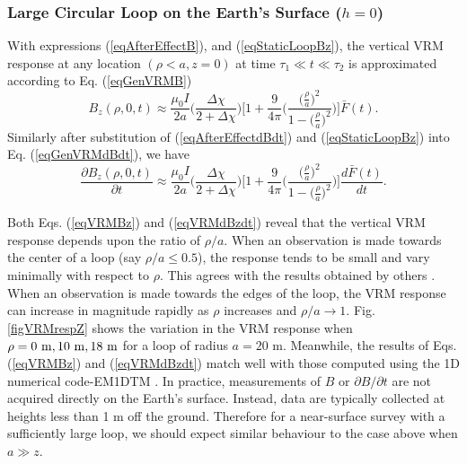 \documentclass[onecolumn]{IEEEtran} %
\begin{document}
\subsubsection{Large Circular Loop on the Earth's Surface ($h=0$)} \label{secVertVRMresp} With expressions (\ref{eqAfterEffectB}), and (\ref{eqStaticLoopBz}), the vertical VRM response at any location $(\rho < a,z=0)$ at time $\tau_1 \ll t \ll \tau_2$ is approximated according to Eq. (\ref{eqGenVRMB})
\begin{equation}
B_z(\rho,0,t) \approx \frac{\mu_0 I}{2a} \Bigg ( \frac{\Delta
\chi}{2+\Delta \chi} \Bigg )  \Bigg [ 1 + \frac{9}{4\pi} \Bigg (
\frac{\big( \frac{\rho}{a} \big )^2}{1- \big( \frac{\rho}{a} \big
)^2} \Bigg ) \Bigg ] \bar F(t).
\label{eqVRMBz}
\end{equation}
Similarly after substitution of (\ref{eqAfterEffectdBdt}) and (\ref{eqStaticLoopBz}) into Eq. (\ref{eqGenVRMdBdt}), we have
\begin{equation} \frac{\partial B_z(\rho,0,t)}{\partial t}  \approx
\frac{\mu_0 I}{2a} \Bigg ( \frac{\Delta \chi}{2+\Delta \chi} \Bigg )
\Bigg [ 1 + \frac{9}{4\pi} \Bigg ( \frac{\big( \frac{\rho}{a} \big
)^2}{1- \big( \frac{\rho}{a} \big )^2} \Bigg ) \Bigg ] \frac{d \bar
F(t)}{dt}.
\label{eqVRMdBzdt}
\end{equation}

Both Eqs. (\ref{eqVRMBz}) and (\ref{eqVRMdBzdt}) reveal that the vertical VRM response depends upon the ratio of $\rho/a$. When an observation is made towards the center of a loop (say $\rho/a \leq 0.5$), the response tends to be small and vary minimally with respect to $\rho$. This agrees with the results obtained by others \cite{Buselli1982,Barsukov2001}. When an observation is made towards the edges of the loop, the VRM response can increase in magnitude rapidly as $\rho$ increases and $\rho/a \rightarrow 1$. Fig. \ref{figVRMrespZ} shows the variation in the VRM response when $\rho = 0 ~{\rm m}, 10 ~{\rm m}, 18 ~{\rm m}$ for a loop of radius $a=20$ m. Meanwhile, the results of Eqs. (\ref{eqVRMBz}) and (\ref{eqVRMdBzdt}) match well with those computed using the 1D numerical code-EM1DTM \cite{EM1DTM}. In practice, measurements of $B$ or $\partial B/\partial t$ are not acquired directly on the Earth's surface. Instead, data are typically collected at heights less than 1 m off the ground. Therefore for a near-surface survey with a sufficiently large loop, we should expect similar behaviour to the case above when $a \gg z$.
\\
\end{document}

